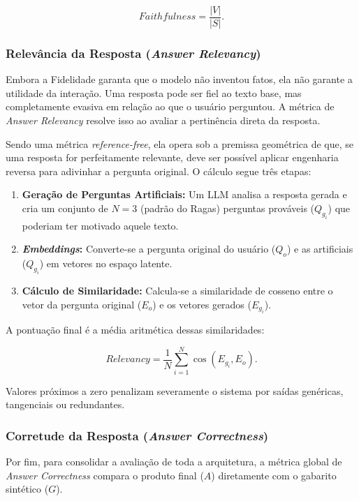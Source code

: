 \begin{equation}
  Faithfulness = \frac{|V|}{|S|}.
\end{equation}

\subsubsection{Relevância da Resposta (\textit{Answer Relevancy})}

Embora a Fidelidade garanta que o modelo não inventou fatos, ela não garante a utilidade da interação. Uma resposta pode ser fiel ao texto base, mas completamente evasiva em relação ao que o usuário perguntou. A métrica de \textit{Answer Relevancy} resolve isso ao avaliar a pertinência direta da resposta.

Sendo uma métrica \textit{reference-free}, ela opera sob a premissa geométrica de que, se uma resposta for perfeitamente relevante, deve ser possível aplicar engenharia reversa para adivinhar a pergunta original. O cálculo segue três etapas:

\begin{enumerate}
  \item \textbf{Geração de Perguntas Artificiais:} Um LLM analisa a resposta gerada e cria um conjunto de $N=3$ (padrão do Ragas) perguntas prováveis ($Q_{g_i}$) que poderiam ter motivado aquele texto.
  \item \textbf{\textit{Embeddings}:} Converte-se a pergunta original do usuário ($Q_o$) e as artificiais ($Q_{g_i}$) em vetores no espaço latente.
  \item \textbf{Cálculo de Similaridade:} Calcula-se a similaridade de cosseno entre o vetor da pergunta original ($E_o$) e os vetores gerados ($E_{g_i}$).
\end{enumerate}

A pontuação final é a média aritmética dessas similaridades:

\begin{equation}
  Relevancy = \frac{1}{N} \sum_{i=1}^{N} \cos(E_{g_i}, E_o).
\end{equation}

Valores próximos a zero penalizam severamente o sistema por saídas genéricas, tangenciais ou redundantes.

\subsubsection{Corretude da Resposta (\textit{Answer Correctness})}

Por fim, para consolidar a avaliação de toda a arquitetura, a métrica global de \textit{Answer Correctness} compara o produto final ($A$) diretamente com o gabarito sintético ($G$).

